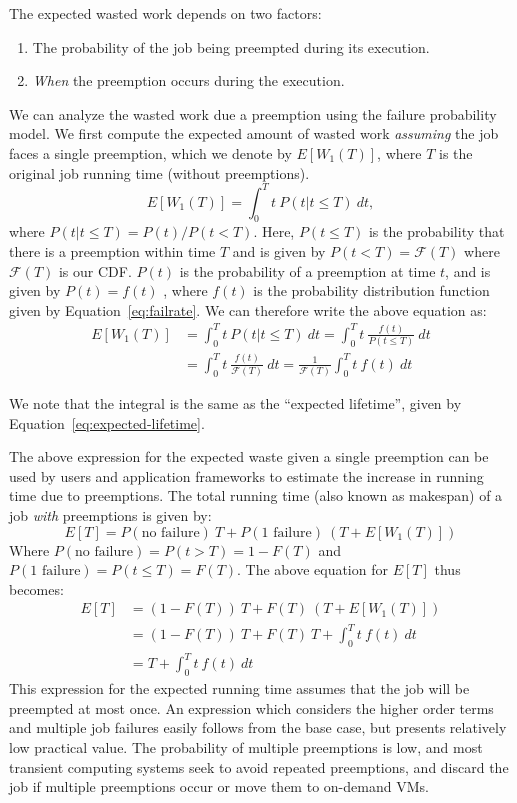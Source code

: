 The expected wasted work depends on two factors:
\begin{enumerate}
\item The probability of the job being preempted during its execution. 
\item \emph{When} the preemption occurs during the execution. 
\end{enumerate}

We can analyze the wasted work due a preemption using the failure probability model.
We first compute the expected amount of wasted work \emph{assuming} the job faces a single preemption, which we denote by $E[W_1(T)]$, where $T$ is the original job running time (without preemptions).
\begin{equation}
E[W_1(T)] = \int_0^{T} t~P(t | t \leq T)~dt , 
\end{equation}
where $P(t|t\leq T) = P(t) / P(t<T)$. Here, $P(t\leq T)$ is the probability that there is a preemption within time $T$ and is given by $P(t<T) = \mathscr{F}(T)$ where $\mathscr{F}(T)$ is our CDF. 
$P(t)$ is the probability of a preemption at time $t$, and is given by $P(t) = f(t)$ , where $f(t)$ is the probability distribution function given by Equation~\ref{eq:failrate}.
We can therefore write the above equation as:
\begin{align}
  E[W_1(T)] &= \int_0^{T} t~P(t | t \leq T)~dt \nonumber 
  = \int_0^{T} t~\frac{f(t)}{P(t \leq T)}~dt \\ 
  &= \int_0^{T} t~\frac{f(t)}{\mathscr{F}(T)}~dt 
    = \frac{1}{\mathscr{F}(T)}  \int_0^{T} t~f(t)~dt
    \label{eq:wasted}
\end{align}

We note that the integral is the same as the ``expected lifetime'', given by Equation~\ref{eq:expected-lifetime}.

The above expression for the expected waste given a single preemption can be used by users and application frameworks to estimate the increase in running time due to preemptions. %
The total running time (also known as makespan) of a job \emph{with} preemptions is given by:
\begin{equation}
  \label{eq:tot-run-time}
  E[T] = P(\text{no failure})~T + P(\text{1 failure})~(T + E[W_1(T)])
\end{equation}
Where $P(\text{no failure}) = P(t > T) =  1- F(T)$ and $P(\text{1 failure}) = P(t \leq T) = F(T)$.
The above equation for $E[T]$ thus becomes: 
%
\begin{align}
  \label{eq:tot-run-time-2}
  E[T] &= (1-F(T))~T + F(T)~(T + E[W_1(T)]) \\ \nonumber
  &= (1-F(T))~T + F(T)~T + \int_0^{T} t~f(t)~dt \\ \nonumber
       &= T + \int_0^{T} t~f(t)~dt         
\end{align}
This expression for the expected running time assumes that the job will be preempted at most once.
An expression which considers the higher order terms and multiple job failures easily follows from the base case, but presents relatively low practical value. 
The probability of multiple preemptions is low, and most transient computing systems seek to avoid repeated preemptions, and discard the job if multiple preemptions occur or move them to on-demand VMs. 


